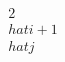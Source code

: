 \documentclass[preview]{standalone}
\begin{document}
\begin{align*}
2\\hat{i} + 1\\hat{j}
\end{align*}
\end{document}
